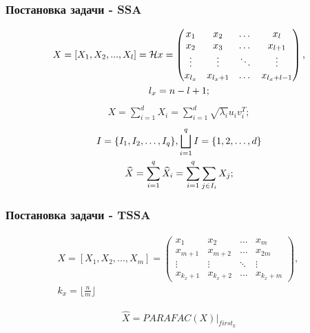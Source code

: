 \documentclass[
	11pt, %
]{beamer}
\begin{document}
\begin{frame}
    \frametitle{Постановка задачи - SSA}
\small
\begin{gather*}
	X = [X_1, X_2, ..., X_{l}] = \mathcal{H} x = 
	 \begin{pmatrix}
		x_{1} & x_{2} & \dots & x_{l} \\
		x_{2} & x_{3} & \dots & x_{l + 1} \\
		\vdots & \vdots & \ddots & \vdots \\
		x_{l_{x}} & x_{l_x + 1} &  \dots & x_{l_x + l - 1}
	\end{pmatrix}, \notag \\
	l_x = n - l + 1;
\end{gather*}
\begin{gather*}
	X = \sum \limits_{i = 1}^{d} X_i = \sum \limits_{i = 1}^{d} \sqrt{\lambda_i} u_i v_i^T;
\end{gather*}
\begin{gather*}
	I = \{ I_1, I_2, \dots, I_q \}, \bigsqcup \limits_{i = 1}^{q} I = \{1, 2, \dots, d\} \notag \\
	\widehat{X} = \sum \limits_{i = 1}^{q} \widehat{X}_i = \sum \limits_{i = 1}^{q} \sum \limits_{j \in I_i} X_j;
\end{gather*}
\end{frame}


\begin{frame}
    \frametitle{Постановка задачи - TSSA}
\small
\begin{gather*}
	X = [X_1, X_2, ..., X_{m}] =
	 \begin{pmatrix}
		x_{1} & x_{2} & \dots & x_{m} \\
		x_{m+1} & x_{m+2} & \dots & x_{2m} \\
		\vdots & \vdots & \ddots & \vdots \\
		x_{k_{x}+1} & x_{k_x + 2} &  \dots & x_{k_x + m}
	\end{pmatrix} \text{, }\\
	k_x = \lfloor \frac{n}{m} \rfloor
\end{gather*}

\begin{gather*}
	\widehat{X} = PARAFAC(X) |_{first_k}
\end{gather*}

\end{frame}

\end{document}

